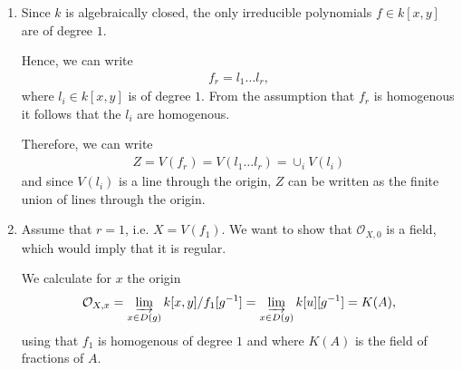 \newcommand{\sheet}{11}




\maketitle{}

\begin{exercise}{1}
    \begin{enumerate}
        \item Since $k$ is algebraically closed, the only irreducible polynomials $f\in k[x,y]$ are of degree $1$.
        
        Hence, we can write 
        \begin{align*}
            f_r=l_1  \dots  l_r,
        \end{align*}
        where $l_i\in k[x,y]$ is of degree $1$. From the assumption that $f_r$ is homogenous it follows that the $l_i$ are homogenous.

        Therefore, we can write
        \begin{align*}
            Z=V(f_r)=V(l_1 \dots  l_r)=\cup_i V(l_i)
        \end{align*}
        and since $V(l_i)$ is a line through the origin, $Z$ can be written as the finite union of lines through the origin.

        \item Assume that $r=1$, i.e. $X=V(f_1).$
        We want to show that $\mathcal{O}_{X,0}$ is a field, which would imply that it is regular.

        We calculate for $x$ the origin 
        \begin{align*}
            \mathcal{O}_{X,x}=\varinjlim_{x\in D(g)} k[x,y]/f_1 [g^{-1}]=\varinjlim_{x\in D(g)} k[u] [g^{-1}]=K(A),
        \end{align*}
        using that $f_1$ is homogenous of degree $1$ and where $K(A)$ is the field of fractions of $A$.

        
    \end{enumerate}

\end{exercise}


